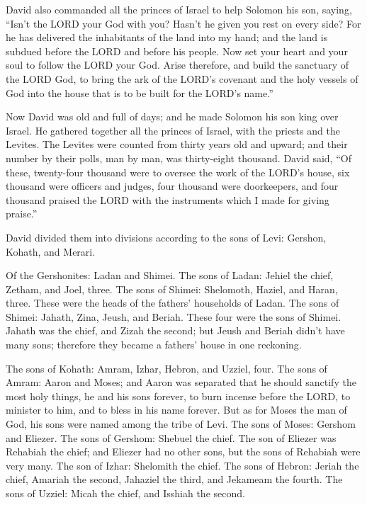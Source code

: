 \myverse{}David also commanded all the princes of Israel to help Solomon
his son, saying,
\myverse{}“Isn’t the LORD your God with you? Hasn’t he given you rest on every side?
For he has delivered the inhabitants of the land into my hand; and the land is subdued before the LORD
and before his people.
\myverse{}Now set your heart and your soul to follow the LORD your God. Arise therefore,
and build the sanctuary of the LORD God, to bring the ark of the LORD’s covenant and the holy vessels
of God into the house that is to be built for the LORD’s name.”


\mychapter{} \myverse*{}Now David was old and full of days; and he made Solomon his son
king over Israel.
\myverse{}He gathered together all the princes of Israel, with the priests and the Levites.
\myverse{}The Levites were counted from thirty years old and upward; and their number
by their polls, man by man, was thirty-eight thousand.
\myverse{}David said, “Of these, twenty-four thousand were to oversee the work of the
LORD’s house, six thousand were officers and judges,
\myverse{}four thousand were doorkeepers, and four thousand praised the LORD with the
instruments which I made for giving praise.”

\myverse{}David divided them into divisions according to the sons of Levi:
Gershon, Kohath, and Merari.

\myverse{}Of the Gershonites: Ladan and Shimei.
\myverse{}The sons of Ladan: Jehiel the chief, Zetham, and Joel, three.
\myverse{}The sons of Shimei: Shelomoth, Haziel, and Haran, three. These were the heads
of the fathers’ households of Ladan.
\myverse{}The sons of Shimei: Jahath, Zina, Jeush, and Beriah. These four were the
sons of Shimei.
\myverse{}Jahath was the chief, and Zizah the second; but Jeush and Beriah didn’t have
many sons; therefore they became a fathers’ house in one reckoning.

\myverse{}The sons of Kohath: Amram, Izhar, Hebron, and Uzziel, four.
\myverse{}The sons of Amram: Aaron and Moses; and Aaron was separated that he should
sanctify the most holy things, he and his sons forever, to burn incense before the LORD, to minister to
him, and to bless in his name forever.
\myverse{}But as for Moses the man of God, his sons were named among the tribe of Levi.
\myverse{}The sons of Moses: Gershom and Eliezer.
\myverse{}The sons of Gershom: Shebuel the chief.
\myverse{}The son of Eliezer was Rehabiah the chief; and Eliezer had no other sons,
but the sons of Rehabiah were very many.
\myverse{}The son of Izhar: Shelomith the chief.
\myverse{}The sons of Hebron: Jeriah the chief, Amariah the second, Jahaziel the third,
and Jekameam the fourth.
\myverse{}The sons of Uzziel: Micah the chief, and Isshiah the second.

